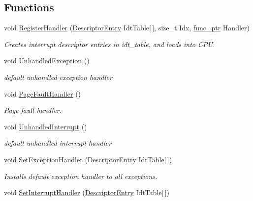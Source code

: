 \subsection*{Functions}
\begin{DoxyCompactItemize}
\item 
void \hyperlink{namespace_i_n_t_r_p_a91a6a2668bfa9961a9ed265f6ceac47d}{Register\+Handler} (\hyperlink{union_i_n_t_r_p_1_1_descriptor_entry}{Descriptor\+Entry} Idt\+Table\mbox{[}$\,$\mbox{]}, size\+\_\+t Idx, \hyperlink{ktypes_8h_a46bbb9e776183ed6a8eca9d919756434}{func\+\_\+ptr} Handler)
\begin{DoxyCompactList}\small\item\em Creates interrupt descriptor entries in idt\+\_\+table, and loads into C\+PU. \end{DoxyCompactList}\item 
void \hyperlink{namespace_i_n_t_r_p_a7732859732913734b09dd07030c41991}{Unhandled\+Exception} ()
\begin{DoxyCompactList}\small\item\em default unhandled exception handler \end{DoxyCompactList}\item 
void \hyperlink{namespace_i_n_t_r_p_aff35666b88439353d86e253d3051f27f}{Page\+Fault\+Handler} ()
\begin{DoxyCompactList}\small\item\em Page fault handler. \end{DoxyCompactList}\item 
void \hyperlink{namespace_i_n_t_r_p_a13c03019c9d7b305743516310096a82a}{Unhandled\+Interrupt} ()
\begin{DoxyCompactList}\small\item\em default unhandled interrupt handler \end{DoxyCompactList}\item 
void \hyperlink{namespace_i_n_t_r_p_a4a1a1ff73a4e9bb1c17daf205170daa9}{Set\+Exception\+Handler} (\hyperlink{union_i_n_t_r_p_1_1_descriptor_entry}{Descriptor\+Entry} Idt\+Table\mbox{[}$\,$\mbox{]})
\begin{DoxyCompactList}\small\item\em Installs default exception handler to all exceptions. \end{DoxyCompactList}\item 
void \hyperlink{namespace_i_n_t_r_p_abf09ee877603981fe255cd050cbbb110}{Set\+Interrupt\+Handler} (\hyperlink{union_i_n_t_r_p_1_1_descriptor_entry}{Descriptor\+Entry} Idt\+Table\mbox{[}$\,$\mbox{]})

\end{DoxyCompactItemize}
